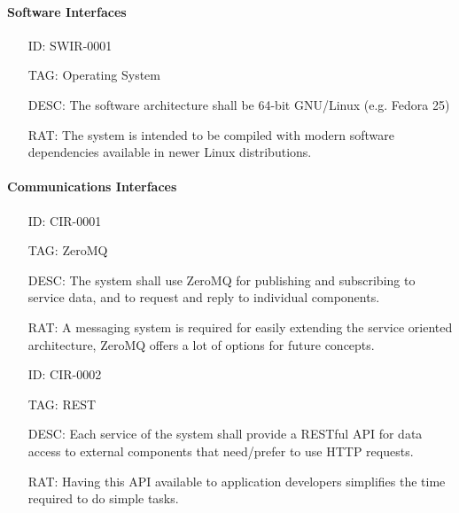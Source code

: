       \paragraph{Software Interfaces}

        \begin{itemize}
          \setlength{\itemindent}{.5in}
          \itemsep .15em
          \item[ID:] SWIR-0001
          \item[TAG:] Operating System
          \item[DESC:] The software architecture shall be 64-bit GNU/Linux
            (e.g. Fedora 25)
          \item[RAT:] The system is intended to be compiled with modern
            software dependencies available in newer Linux distributions.
        \end{itemize}

      \paragraph{Communications Interfaces}

        \begin{itemize}
          \setlength{\itemindent}{.5in}
          \itemsep .15em
          \item[ID:] CIR-0001
          \item[TAG:] ZeroMQ
          \item[DESC:] The system shall use ZeroMQ for publishing and
            subscribing to service data, and to request and reply to
            individual components.
          \item[RAT:] A messaging system is required for easily extending the
            service oriented architecture, ZeroMQ offers a lot of options for
            future concepts.
        \end{itemize}

        \begin{itemize}
          \setlength{\itemindent}{.5in}
          \itemsep .15em
          \item[ID:] CIR-0002
          \item[TAG:] REST
          \item[DESC:] Each service of the system shall provide a RESTful API
            for data access to external components that need/prefer to use
            HTTP requests.
          \item[RAT:] Having this API available to application developers
            simplifies the time required to do simple tasks.
        \end{itemize}

